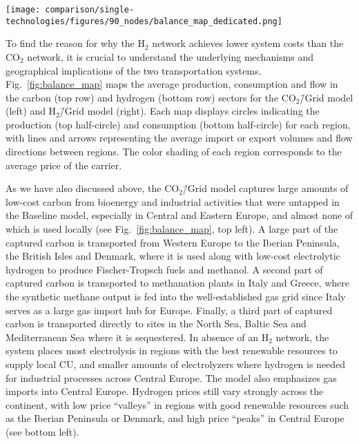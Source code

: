 \documentclass[twocolumn]{article}
\newcommand{\COtwo}{CO$_2$}
\newcommand{\Htwo}{H$_2$}
\newcommand{\modBase}{Baseline model}
\newcommand{\modCO}{CO$_2$\=/Grid model}
\newcommand{\modH}{H$_2$\=/Grid model}
\newcommand{\carbon}{CO$_2$}
\newcommand{\hydrogen}{H$_2$}
\newcommand{\carbonmodel}{CO$_2$\=/Grid model}
\newcommand{\hydrogenmodel}{H$_2$\=/Grid model}
\begin{document}
\begin{figure*}[ht!]
    \centering
    \texttt{[image: comparison/single-technologies/figures/90\_nodes/balance\_map\_dedicated.png]}
    \caption{Optimal operation, flows and prices of the carbon (top line) and hydrogen (bottom line) sectors for the \carbonmodel{} (left) and the \hydrogenmodel{} (right) in the net zero scenario. For each region, upper semicircles show the average production per technology, lower semicircles the consumption, and colors the average marginal prices. Lines and arrows show the interregional transportation. Carbon sequestration offshore are drawn as full circles. \carbon{} and \hydrogen{} transport goes from low price to high price areas to supply CU and, in the case of \carbonmodel{}, CS.
    }
    \label{fig:balance_map}
\end{figure*}

To find the reason for why the \Htwo{} network achieves lower system costs than the \COtwo{} network, it is crucial to understand the underlying mechanisms and geographical implications of the two transportation systems. Fig.~\ref{fig:balance_map} maps the average production, consumption and flow in the carbon (top row) and hydrogen (bottom row) sectors for the \modCO{} (left) and \modH{} (right). Each map displays circles indicating the production (top half-circle) and consumption (bottom half-circle) for each region, with lines and arrows representing the average import or export volumes and flow directions between regions. The color shading of each region corresponds to the average price of the carrier.

As we have also discussed above, the \modCO{} captures large amounts of low-cost carbon from bioenergy and industrial activities that were untapped in the \modBase{}, especially in Central and Eastern Europe, and almost none of which is used locally (see Fig.~\ref{fig:balance_map}, top left). A large part of the captured carbon is transported from Western Europe to the Iberian Peninsula, the British Isles and Denmark, where it is used along with low-cost electrolytic hydrogen to produce Fischer-Tropsch fuels and methanol. A second part of captured carbon is transported to methanation plants in Italy and Greece, where the synthetic methane output is fed into the well-established gas grid since Italy serves as a large gas import hub for Europe. Finally, a third part of captured carbon is transported directly to sites in the North Sea, Baltic Sea and Mediterranean Sea where it is sequestered. In absence of an \Htwo{} network, the system places most electrolysis in regions with the best renewable resources to supply local CU, and smaller amounts of electrolyzers where hydrogen is needed for industrial processes across Central Europe. The model also emphasizes gas imports into Central Europe. Hydrogen prices still vary strongly across the continent, with low price ``valleys'' in regions with good renewable resources such as the Iberian Peninsula or Denmark, and high price ``peaks'' in Central Europe (see bottom left).
\end{document}
